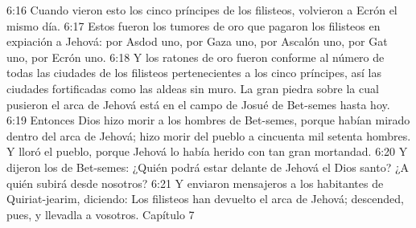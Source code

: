 6:16 Cuando vieron esto los cinco príncipes de los filisteos, volvieron a Ecrón el mismo día.  
6:17 Estos fueron los tumores de oro que pagaron los filisteos en expiación a Jehová: por Asdod uno, por Gaza uno, por Ascalón uno, por Gat uno, por Ecrón uno.  
6:18 Y los ratones de oro fueron conforme al número de todas las ciudades de los filisteos pertenecientes a los cinco príncipes, así las ciudades fortificadas como las aldeas sin muro. La gran piedra sobre la cual pusieron el arca de Jehová está en el campo de Josué de Bet-semes hasta hoy.  
6:19 Entonces Dios hizo morir a los hombres de Bet-semes, porque habían mirado dentro del arca de Jehová; hizo morir del pueblo a cincuenta mil setenta hombres. Y lloró el pueblo, porque Jehová lo había herido con tan gran mortandad.  
6:20 Y dijeron los de Bet-semes: ¿Quién podrá estar delante de Jehová el Dios santo? ¿A quién subirá desde nosotros?  
6:21 Y enviaron mensajeros a los habitantes de Quiriat-jearim, diciendo: Los filisteos han devuelto el arca de Jehová; descended, pues, y llevadla a vosotros.  
Capítulo 7 

